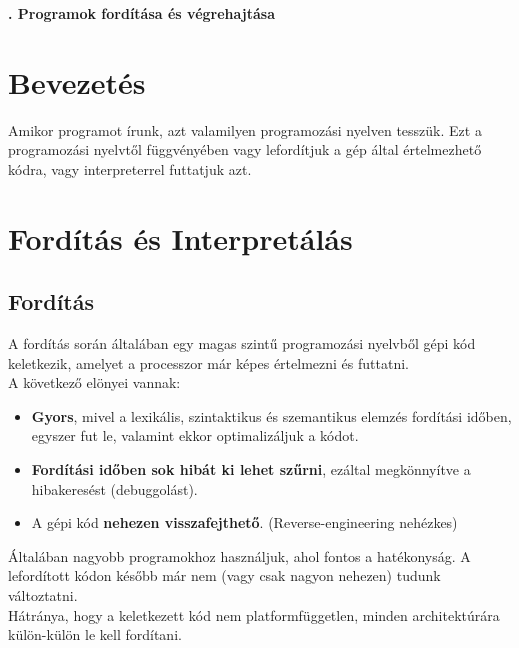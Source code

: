 \documentclass[12pt,margin=0px]{article}
\begin{document}
    \thispagestyle{fancy}

    \begin{center}
        {\huge\bfseries{}. Programok fordítása és végrehajtása} \\
    \end{center}
	
\section*{Bevezetés}
	
	Amikor programot írunk, azt valamilyen programozási nyelven tesszük. Ezt a programozási nyelvtől függvényében vagy lefordítjuk a gép által értelmezhető kódra, vagy interpreterrel futtatjuk azt.
	
\section*{Fordítás és Interpretálás}
	
\subsection*{Fordítás}
	
    A fordítás során általában egy magas szintű programozási nyelvből gépi kód keletkezik, amelyet a processzor már képes értelmezni és futtatni.\\

    \noindent A következő elönyei vannak:
    \begin{itemize}
        \item \textbf{Gyors}, mivel a lexikális, szintaktikus és szemantikus elemzés fordítási időben, egyszer fut le, valamint ekkor optimalizáljuk a kódot.
        \item \textbf{Fordítási időben sok hibát ki lehet szűrni}, ezáltal megkönnyítve a hibakeresést (debuggolást).
        \item A gépi kód \textbf{nehezen visszafejthető}. (Reverse-engineering nehézkes)
    \end{itemize}
    Általában nagyobb programokhoz használjuk, ahol fontos a hatékonyság. A lefordított kódon később már nem (vagy csak nagyon nehezen) tudunk változtatni.\\
	
	\noindent Hátránya, hogy a keletkezett kód nem platformfüggetlen, minden architektúrára külön-külön le kell fordítani.\\
	
\end{document}
